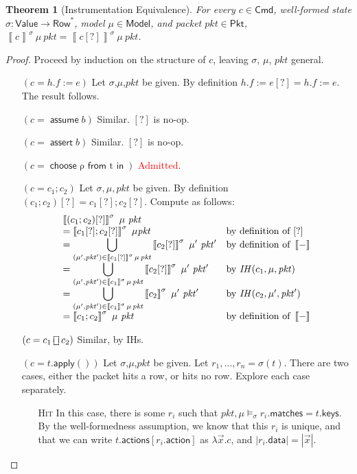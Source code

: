\documentclass{article}
\newcommand{\pkt}{\mathit{pkt}}
\newcommand{\denote}[1]{\left\llbracket#1\right\rrbracket}
\newcommand{\Value}{\mathsf{Value}}
\newcommand{\Cmd}{\mathsf{Cmd}}
\newcommand{\Pkt}{\mathsf{Pkt}}
\newcommand{\Model}{\mathsf{Model}}
\newcommand{\Row}{\mathsf{Row}}
\newcommand{\matches}{\mathsf{matches}}
\newcommand{\action}{\mathsf{action}}
\newcommand{\actions}{\mathsf{actions}}
\newcommand{\keys}{\mathsf{keys}}
\newcommand{\data}{\mathsf{data}}
\newcommand{\assert}{\mathop{\mathsf{assert}}}
\newcommand{\assume}{\mathop{\mathsf{assume}}}
\newcommand{\apply}{\mathsf{apply}}
\newcommand{\choiceop}{\rotatebox[origin=c]{90}{$\sqsubset\!\!\!\sqsupset$}}
\newcommand{\choice}{\mathbin{\choiceop}}
\renewcommand{\choose}[2]{\mathop{\mathsf{choose}~#1~\mathsf{from}~#2~\mathsf{in}}}
\newtheorem{theorem}{Theorem}
\begin{document}
\begin{theorem}[Instrumentation Equivalence]
  \label{thm:instr-equiv}
  For every $c \in \Cmd$, well-formed state $\sigma : \Value \to \Row^*$, model
  $\mu \in \Model$, and packet $\pkt \in \Pkt$, $\denote{c}^\sigma~\mu~\pkt =
  \denote{c[?]}^\sigma~\mu~\pkt$.
\end{theorem}

\begin{proof}
  Proceed by induction on the structure of $c$, leaving $\sigma$, $\mu$, $\pkt$ general.
  \begin{enumerate}[align=left]
  \item[$(c = h.f := e)$]
    Let $\sigma$,$\mu$,$\pkt$ be given.
    By definition $h.f:=e[?] = h.f:=e$. The result follows.
  \item[$(c = \assume b)$] Similar. $[?]$ is no-op.
  \item[$(c = \assert b)$] Similar. $[?]$ is no-op.
  \item[$(c = \choose \rho t)$] \textcolor{red}{Admitted}.
  \item[$(c = c_1;c_2)$]
    Let $\sigma,\mu,\pkt$ be given.
    By definition $(c_1;c_2)[?] = c_1[?]; c_2[?]$.
    Compute as follows:
    \[\begin{array}{>{\displaystyle}ll}
    \denote{(c_1;c_2)[?]}^\sigma~\mu~\pkt \\
    = \denote{c_1[?];c_2[?]}^\sigma~\mu\pkt
    & \text{by definition of } [?]  \\
    = \bigcup_{(\mu',\pkt') \in \denote{c_1[?]}^\sigma\,\mu\,\pkt}\denote{c_2[?]}^\sigma~\mu'~\pkt'
    & \text{by definition of }\denote{-} \\
    = \bigcup_{(\mu',\pkt') \in \denote{c_1}^\sigma\,\mu\,\pkt}\denote{c_2[?]}^\sigma~\mu'~\pkt'
    & \text{by } \mathit{IH}(c_1, \mu, \pkt) \\
    = \bigcup_{(\mu',\pkt') \in \denote{c_1}^\sigma\,\mu\,\pkt}\denote{c_2}^\sigma~\mu'~\pkt'
    & \text{by } \mathit{IH}(c_2, \mu', \pkt') \\
    = \denote{c_1;c_2}^\sigma~\mu~\pkt
    & \text{by definition of } \denote{-}
    \end{array}
    \]
  \item[$(c = c_1 \choice c_2)$] Similar, by IHs.

  \item[$(c = t.\apply())$]
    Let $\sigma$,$\mu$,$\pkt$ be given.
    Let $r_1,\ldots,r_n = \sigma(t)$.
    There are two cases, either the packet hits a row, or hits no row. Explore each case separately.
    \begin{enumerate}
    \item[\textsc{Hit}] In this case, there is some $r_i$ such that $\pkt,\mu
      \models_\sigma r_i.\matches = t.\keys$. By the well-formedness assumption,
      we know that this $r_i$ is unique, and that we can write
      $t.\actions[r_i.\action]$ as $\lambda \vec x. c$, and $|r_i.\data| = |\vec x|$.


\end{enumerate}
\end{enumerate}
\end{proof}
\end{document}
